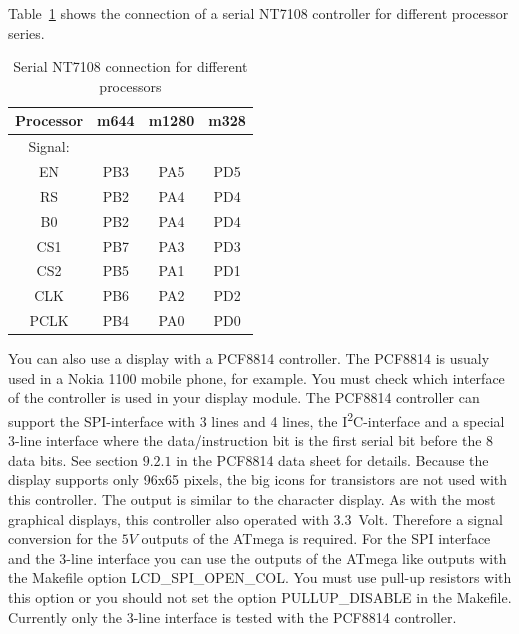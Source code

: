 Table~\ref{tab:7108-processor} shows the connection of a serial NT7108 controller
for different processor series.
\begin{table}[H]
  \begin{center}
    \begin{tabular}{| c || c | c | c |}
    \hline
 Processor  & m644  &  m1280  & m328 \\
    \hline
    \hline
Signal:     &       &        &         \\
  EN        &  PB3  &  PA5   & PD5     \\
    \hline
  RS        &  PB2  &  PA4   & PD4      \\
  B0        &  PB2  &  PA4   & PD4      \\
    \hline
  CS1       &  PB7  &  PA3   & PD3      \\
    \hline
  CS2       &  PB5  &  PA1   & PD1      \\
    \hline
  CLK       &  PB6  &  PA2   & PD2      \\
    \hline
  PCLK      &  PB4  &  PA0   & PD0      \\
    \hline
    \end{tabular}
  \end{center}
  \caption{Serial NT7108 connection for different processors}
  \label{tab:7108-processor}
\end{table}

You can also use a display with a PCF8814 controller.
The PCF8814 is usualy used in a Nokia 1100 mobile phone, for example.
You must check which interface of the controller is used in your display module.
The PCF8814 controller can support the SPI-interface with 3 lines and 4 lines,
the I\textsuperscript{2}C-interface and a special 3-line interface where 
the data/instruction bit is the first serial bit before the 8 data bits.
See section \(9.2.1\) in the PCF8814 data sheet for details.
Because the display supports only 96x65 pixels, the big icons for transistors are not
used with this controller. The output is similar to the character display.
As with the most graphical displays, this controller also operated with 3.3~Volt.
Therefore a signal conversion for the \(5V\) outputs of the ATmega is required.
For the SPI interface and the 3-line interface you can use the outputs of the ATmega
like  outputs with the Makefile option LCD\_SPI\_OPEN\_COL.
You must use pull-up resistors with this option or you should not set
the option PULLUP\_DISABLE in the Makefile.
Currently only the 3-line interface is tested with the PCF8814 controller.

